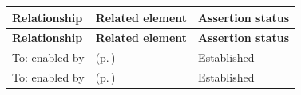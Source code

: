 \begingroup\small\setlength{\TableWidth}{\dimexpr\linewidth-6\tabcolsep-4\arrayrulewidth\relax}
\begin{longtable}{|>{\raggedright\arraybackslash}p{0.27\TableWidth}|>{\raggedright\arraybackslash}p{0.48\TableWidth}|>{\raggedright\arraybackslash}p{0.25\TableWidth}|}
\hline\rowcolor{TableHead}\textbf{Relationship} & \textbf{Related element} & \textbf{Assertion status}\\\hline\endfirsthead
\hline\rowcolor{TableHead}\textbf{Relationship} & \textbf{Related element} & \textbf{Assertion status}\\\hline\endhead
\hline\endfoot
To: enabled by & \nameref{cap:bec-assurance-design} (p.\,\pageref{cap:bec-assurance-design}) & Established\\\hline
To: enabled by & \nameref{cap:bec-assurance-criteria-management} (p.\,\pageref{cap:bec-assurance-criteria-management}) & Established\\\hline
\end{longtable}\endgroup

